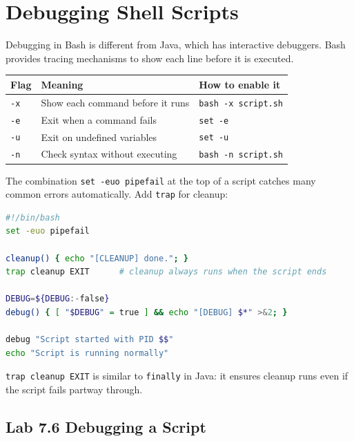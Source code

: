 \section{Debugging Shell Scripts}
\label{sec:debugging-script}

Debugging in Bash is different from Java, which has interactive debuggers.
Bash provides tracing mechanisms to show each line before it is executed.

\begin{center}
\begin{tabular}{lll}
\hline
\textbf{Flag} & \textbf{Meaning} & \textbf{How to enable it} \\
\hline
\texttt{-x} & Show each command before it runs & \texttt{bash -x script.sh} \\
\texttt{-e} & Exit when a command fails & \texttt{set -e} \\
\texttt{-u} & Exit on undefined variables & \texttt{set -u} \\
\texttt{-n} & Check syntax without executing & \texttt{bash -n script.sh} \\
\hline
\end{tabular}
\end{center}

The combination \texttt{set -euo pipefail} at the top of a script catches many
common errors automatically. Add \texttt{trap} for cleanup:

\begin{lstlisting}[language=bash, caption={Defensive script pattern}]
#!/bin/bash
set -euo pipefail

cleanup() { echo "[CLEANUP] done."; }
trap cleanup EXIT      # cleanup always runs when the script ends

DEBUG=${DEBUG:-false}
debug() { [ "$DEBUG" = true ] && echo "[DEBUG] $*" >&2; }

debug "Script started with PID $$"
echo "Script is running normally"
\end{lstlisting}

\begin{notebox}
\texttt{trap cleanup EXIT} is similar to \texttt{finally} in Java: it ensures
cleanup runs even if the script fails partway through.
\end{notebox}

\subsection*{Lab 7.6 Debugging a Script}

